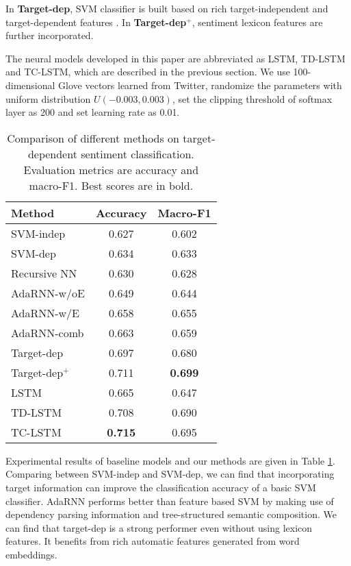 \documentclass[11pt]{article}
\begin{document}
In \textbf{Target-dep}, SVM classifier is built based on rich target-independent and target-dependent features \cite{Vo2015}. In \textbf{Target-dep$^+$}, sentiment lexicon features are further incorporated. 

The neural models developed in this paper are abbreviated as LSTM, TD-LSTM and TC-LSTM, which are described in the previous section. We use 100-dimensional Glove vectors learned from Twitter, randomize the parameters with uniform distribution $U(-0.003, 0.003)$, set the clipping threshold of softmax layer as 200 and set learning rate as 0.01.

\begin{table}[h]
	\centering
	\begin{tabular}{l|cc}
		\hline
		Method & Accuracy & Macro-F1\\
		\hline
		SVM-indep 			& 0.627 & 0.602 \\
		SVM-dep	 			& 0.634 & 0.633 \\
		Recursive NN		& 0.630 & 0.628 \\
		AdaRNN-w/oE		 	& 0.649 & 0.644 \\
		AdaRNN-w/E	 		& 0.658 & 0.655 \\
		AdaRNN-comb			& 0.663 & 0.659 \\
		Target-dep			& 0.697 & 0.680 \\
		Target-dep$^+$ 		& 0.711 & \textbf{0.699} \\
		\hline
		LSTM 				& 0.665	& 0.647	\\
		TD-LSTM				& 0.708	& 0.690 \\
		TC-LSTM				& \textbf{0.715} & 0.695\\
		\hline
	\end{tabular}
	\caption{Comparison of different methods on target-dependent sentiment classification. Evaluation metrics are accuracy and macro-F1. Best scores are in {bold}.}
	\label{table:experiment-baseline}
\end{table}

Experimental results of baseline models and our methods are given in Table \ref{table:experiment-baseline}. 
Comparing between SVM-indep and SVM-dep, we can find that incorporating target information can improve the classification accuracy of a basic SVM classifier. 
AdaRNN performs better than feature based SVM by making use of dependency parsing information and tree-structured semantic composition.
We can find that target-dep is a strong performer even without using lexicon features. It benefits from rich automatic features generated from word embeddings. 
\end{document}
